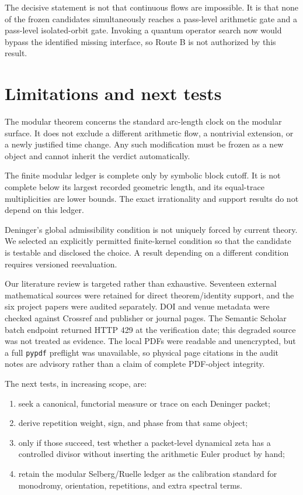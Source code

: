 \documentclass[11pt]{article}
\theoremstyle{definition}
\theoremstyle{remark}
\begin{document}
The decisive statement is not that continuous flows are impossible.  It is
that none of the frozen candidates simultaneously reaches a pass-level
arithmetic gate and a pass-level isolated-orbit gate.  Invoking a quantum
operator search now would bypass the identified missing interface, so Route B
is not authorized by this result.

\section{Limitations and next tests}

The modular theorem concerns the standard arc-length clock on the modular
surface.  It does not exclude a different arithmetic flow, a nontrivial
extension, or a newly justified time change.  Any such modification must be
frozen as a new object and cannot inherit the verdict automatically.

The finite modular ledger is complete only by symbolic block cutoff.  It is
not complete below its largest recorded geometric length, and its equal-trace
multiplicities are lower bounds.  The exact irrationality and support results
do not depend on this ledger.

Deninger's global admissibility condition is not uniquely forced by current
theory.  We selected an explicitly permitted finite-kernel condition so that
the candidate is testable and disclosed the choice.  A result depending on a
different condition requires versioned reevaluation.

Our literature review is targeted rather than exhaustive.  Seventeen external
mathematical sources were retained for direct theorem/identity support, and
the six project papers were audited separately.  DOI and venue metadata were
checked against Crossref and publisher or journal pages.  The Semantic Scholar
batch endpoint returned HTTP 429 at the verification date; this degraded
source was not treated as evidence.  The local PDFs were readable and
unencrypted, but a full \texttt{pypdf} preflight was unavailable, so physical
page citations in the audit notes are advisory rather than a claim of complete
PDF-object integrity.

The next tests, in increasing scope, are:
\begin{enumerate}[leftmargin=*]
 \item seek a canonical, functorial measure or trace on each Deninger packet;
 \item derive repetition weight, sign, and phase from that same object;
 \item only if those succeed, test whether a packet-level dynamical zeta has a
 controlled divisor without inserting the arithmetic Euler product by hand;
 \item retain the modular Selberg/Ruelle ledger as the calibration standard
 for monodromy, orientation, repetitions, and extra spectral terms.
\end{enumerate}
\end{document}
